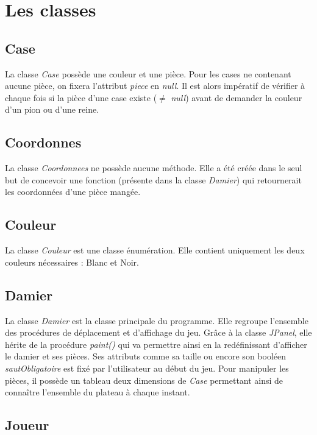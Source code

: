 \documentclass[12,french]{report}
\begin{document}
\chapter{Les classes}

\section{Case}

La classe \textit{Case} possède une couleur et une pièce. Pour les cases ne contenant aucune pièce, on fixera l'attribut \textit{piece} en \textit{null}. Il est alors impératif de vérifier à chaque fois si la pièce d'une case existe ($\neq$ \textit{null}) avant de demander la couleur d'un pion ou d'une reine.


\section{Coordonnes}

La classe \textit{Coordonnees} ne possède aucune méthode. Elle a été créée dans le seul but de concevoir une fonction (présente dans la classe \textit{Damier}) qui retournerait les coordonnées d'une pièce mangée.

\section{Couleur}

La classe \textit{Couleur} est une classe énumération. Elle contient uniquement les deux couleurs nécessaires : Blanc et Noir.

\section{Damier}

La classe \textit{Damier} est la classe principale du programme. Elle regroupe l'ensemble des procédures de déplacement et d'affichage du jeu. Grâce à la classe \textit{JPanel}, elle hérite de la procédure \textit{paint()} qui va permettre ainsi en la redéfinissant d'afficher le damier et ses pièces. Ses attributs comme sa taille ou encore son booléen \textit{sautObligatoire} est fixé par l'utilisateur au début du jeu. Pour manipuler les pièces, il possède un tableau deux dimensions de \textit{Case} permettant ainsi de connaître l'ensemble du plateau à chaque instant.

\section{Joueur}
\end{document}
